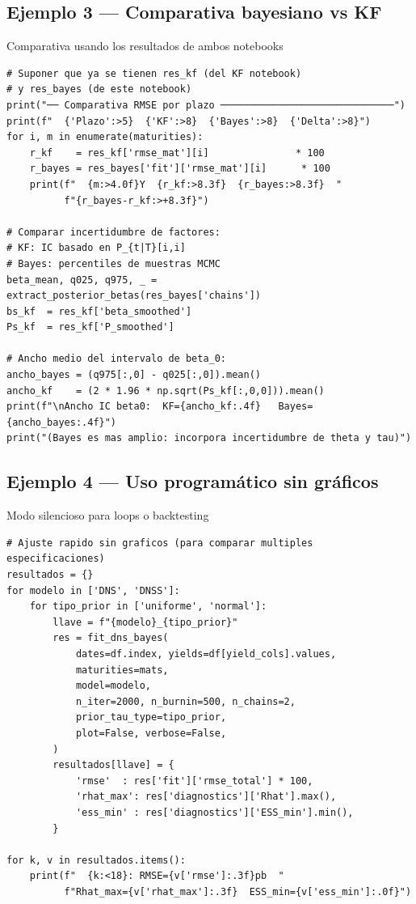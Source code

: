 \documentclass[12pt, a4paper]{article}
\theoremstyle{plain}
\theoremstyle{definition}
\theoremstyle{remark}
\begin{document}
\subsection{Ejemplo 3 — Comparativa bayesiano vs KF}

\begin{codigocaja}{Comparativa usando los resultados de ambos notebooks}
\begin{lstlisting}
# Suponer que ya se tienen res_kf (del KF notebook)
# y res_bayes (de este notebook)
print("── Comparativa RMSE por plazo ──────────────────────────────")
print(f"  {'Plazo':>5}  {'KF':>8}  {'Bayes':>8}  {'Delta':>8}")
for i, m in enumerate(maturities):
    r_kf    = res_kf['rmse_mat'][i]               * 100
    r_bayes = res_bayes['fit']['rmse_mat'][i]      * 100
    print(f"  {m:>4.0f}Y  {r_kf:>8.3f}  {r_bayes:>8.3f}  "
          f"{r_bayes-r_kf:>+8.3f}")

# Comparar incertidumbre de factores:
# KF: IC basado en P_{t|T}[i,i]
# Bayes: percentiles de muestras MCMC
beta_mean, q025, q975, _ = extract_posterior_betas(res_bayes['chains'])
bs_kf  = res_kf['beta_smoothed']
Ps_kf  = res_kf['P_smoothed']

# Ancho medio del intervalo de beta_0:
ancho_bayes = (q975[:,0] - q025[:,0]).mean()
ancho_kf    = (2 * 1.96 * np.sqrt(Ps_kf[:,0,0])).mean()
print(f"\nAncho IC beta0:  KF={ancho_kf:.4f}   Bayes={ancho_bayes:.4f}")
print("(Bayes es mas amplio: incorpora incertidumbre de theta y tau)")
\end{lstlisting}
\end{codigocaja}

\subsection{Ejemplo 4 — Uso programático sin gráficos}

\begin{codigocaja}{Modo silencioso para loops o backtesting}
\begin{lstlisting}
# Ajuste rapido sin graficos (para comparar multiples especificaciones)
resultados = {}
for modelo in ['DNS', 'DNSS']:
    for tipo_prior in ['uniforme', 'normal']:
        llave = f"{modelo}_{tipo_prior}"
        res = fit_dns_bayes(
            dates=df.index, yields=df[yield_cols].values,
            maturities=mats,
            model=modelo,
            n_iter=2000, n_burnin=500, n_chains=2,
            prior_tau_type=tipo_prior,
            plot=False, verbose=False,
        )
        resultados[llave] = {
            'rmse'  : res['fit']['rmse_total'] * 100,
            'rhat_max': res['diagnostics']['Rhat'].max(),
            'ess_min' : res['diagnostics']['ESS_min'].min(),
        }

for k, v in resultados.items():
    print(f"  {k:<18}: RMSE={v['rmse']:.3f}pb  "
          f"Rhat_max={v['rhat_max']:.3f}  ESS_min={v['ess_min']:.0f}")
\end{lstlisting}
\end{codigocaja}
\end{document}
